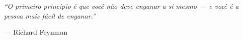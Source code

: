 \documentclass[msc]{on} %
\begin{document}


\pagestyle{empty} %

\null\vfill\vfill\vfill\vfill\vfill\vfill\vfill %

\begin{flushright}
{\normalsize 

\textit{``O primeiro princípio é que você não deve enganar a si mesmo --- e você é a pessoa mais fácil de enganar.''}

--- Richard Feynman

}
\end{flushright}

\vfill\vfill\vfill\null %

\clearpage
\end{document}
